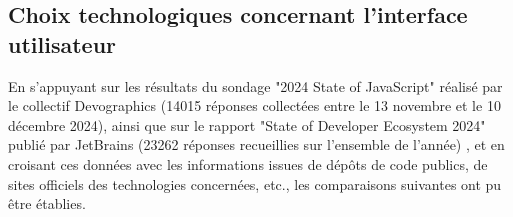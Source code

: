 \subsection{Choix technologiques concernant l'interface utilisateur} \label{sec:choix_client}

En s’appuyant sur les résultats du sondage "2024 State of JavaScript" réalisé par le collectif Devographics (14015 réponses collectées entre le 13 novembre et le 10 décembre 2024), ainsi que sur le rapport "State of Developer Ecosystem 2024" publié par JetBrains (23262 réponses recueillies sur l’ensemble de l’année) \autocites{noauthor_state_nodate}{noauthor_state_nodate-1}{noauthor_software_nodate}, et en croisant ces données avec les informations issues de dépôts de code publics, de sites officiels des technologies concernées, etc., les comparaisons suivantes ont pu être établies.

